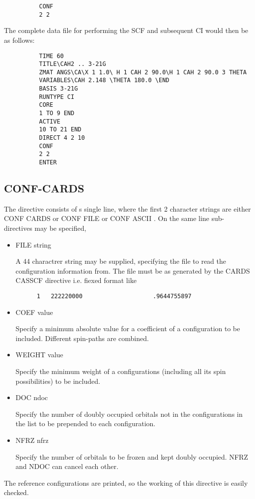 \documentclass[11pt,fleqn]{article}
\begin{document}
{
\footnotesize
\begin{verbatim}
          CONF
          2 2
\end{verbatim}
}
The complete data file for performing the
SCF and subsequent CI would then be as follows:
{
\footnotesize
\begin{verbatim}
          TIME 60 
          TITLE\CAH2 .. 3-21G
          ZMAT ANGS\CA\X 1 1.0\ H 1 CAH 2 90.0\H 1 CAH 2 90.0 3 THETA
          VARIABLES\CAH 2.148 \THETA 180.0 \END
          BASIS 3-21G
          RUNTYPE CI
          CORE
          1 TO 9 END
          ACTIVE
          10 TO 21 END
          DIRECT 4 2 10
          CONF
          2 2
          ENTER
\end{verbatim}
}

\subsection[CONF-CARDS]{CONF-CARDS }

The directive consists of s single line, where the first 2 character strings are either
CONF CARDS or CONF FILE or CONF ASCII .  On the same line sub-directives
may be specified,
\begin{itemize}
\item FILE  string

A 44 charactrer string may be supplied, specifying the file to read the configuration
information from. The file must be as generated by the CARDS CASSCF directive i.e. 
fiexed format like
\begin{verbatim}
      1   222220000                    .9644755897
\end{verbatim}
\item COEF value

Specify a minimum absolute value for a coefficient of a configuration to be 
included. Different spin-paths are combined.
\item WEIGHT value

Specify the minimum weight of a configurations (including all its spin possibilities)
to be included.
\item DOC ndoc

Specify the number of doubly occupied orbitals not in the configurations in the list
to be prepended to each configuration.
\item NFRZ nfrz

Specify the number of orbitals to be frozen and kept doubly occupied.
NFRZ and NDOC can cancel each other.
\end{itemize}
The reference configurations are printed, so the working of this directive is easily checked.
\end{document}
